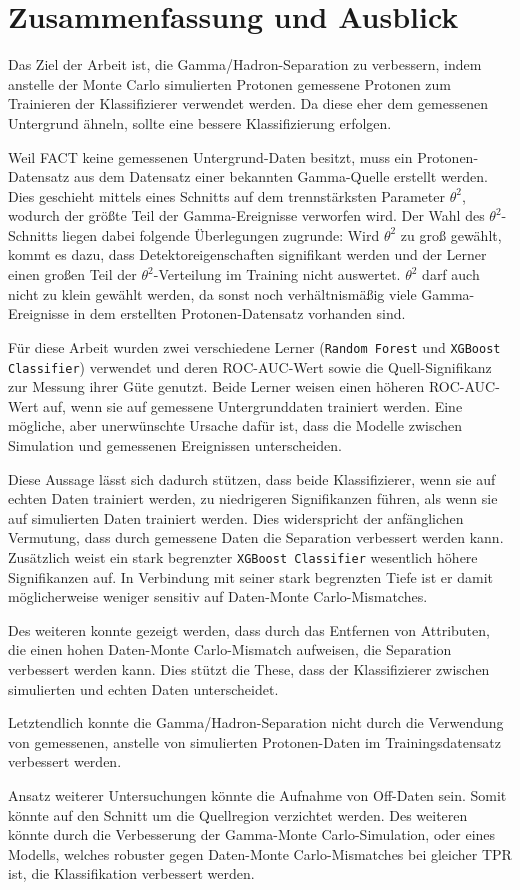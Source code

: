 \chapter{Zusammenfassung und Ausblick}
Das Ziel der Arbeit ist, die Gamma/Hadron-Separation zu verbessern, indem anstelle der Monte Carlo simulierten Protonen gemessene Protonen zum Trainieren der Klassifizierer verwendet werden. 
Da diese eher dem gemessenen Untergrund ähneln, sollte eine bessere Klassifizierung erfolgen.

Weil FACT keine gemessenen Untergrund-Daten besitzt, muss ein Protonen-Datensatz aus dem Datensatz einer bekannten Gamma-Quelle erstellt werden. 
Dies geschieht mittels eines Schnitts auf dem trennstärksten Parameter $\theta^{2}$, wodurch der größte Teil der Gamma-Ereignisse verworfen wird.
Der Wahl des $\theta^{2}$-Schnitts liegen dabei folgende Überlegungen zugrunde:
Wird $\theta^{2}$ zu groß gewählt, kommt es dazu, dass Detektoreigenschaften signifikant werden und der Lerner einen großen Teil der $\theta^{2}$-Verteilung im Training nicht auswertet. 
$\theta^{2}$ darf auch nicht zu klein gewählt werden, da sonst noch verhältnismäßig viele Gamma-Ereignisse in dem erstellten Protonen-Datensatz vorhanden sind.

Für diese Arbeit wurden zwei verschiedene Lerner (\texttt{Random Forest} und \texttt{XGBoost Classifier}) verwendet und deren ROC-AUC-Wert sowie die Quell-Signifikanz zur Messung ihrer Güte genutzt. 
Beide Lerner weisen einen höheren ROC-AUC-Wert auf, wenn sie auf gemessene Untergrunddaten trainiert werden.
Eine mögliche, aber unerwünschte Ursache dafür ist, dass die Modelle zwischen Simulation und gemessenen Ereignissen unterscheiden.

Diese Aussage lässt sich dadurch stützen, dass beide Klassifizierer, wenn sie auf echten Daten trainiert werden, zu niedrigeren Signifikanzen führen, als wenn sie auf simulierten Daten trainiert werden. 
Dies widerspricht der anfänglichen Vermutung, dass durch gemessene Daten die Separation verbessert werden kann. 
Zusätzlich weist ein stark begrenzter \texttt{XGBoost Classifier} wesentlich höhere Signifikanzen auf. 
In Verbindung mit seiner stark begrenzten Tiefe ist er damit möglicherweise weniger sensitiv auf Daten-Monte Carlo-Mismatches. 

Des weiteren konnte gezeigt werden, dass durch das Entfernen von Attributen, die einen hohen Daten-Monte Carlo-Mismatch aufweisen, die Separation verbessert werden kann. 
Dies stützt die These, dass der Klassifizierer zwischen simulierten und echten Daten unterscheidet.

Letztendlich konnte die Gamma/Hadron-Separation nicht durch die Verwendung von gemessenen, anstelle von simulierten Protonen-Daten im Trainingsdatensatz verbessert werden. 

Ansatz weiterer Untersuchungen könnte die Aufnahme von Off-Daten sein.
Somit könnte auf den Schnitt um die Quellregion verzichtet werden. 
Des weiteren könnte durch die Verbesserung der Gamma-Monte Carlo-Simulation, oder eines Modells, welches robuster gegen Daten-Monte Carlo-Mismatches bei gleicher TPR ist, die Klassifikation verbessert werden.
